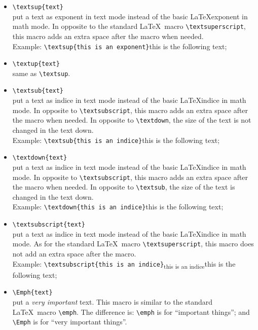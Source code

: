 \documentclass[book]{upmethodology-document}
\begin{document}
\begin{itemize}
\item \texttt{{\textbackslash}textsup\{text\}} \\
	put a text as exponent in text mode instead of the basic \LaTeX exponent in math mode. In opposite to the standard \LaTeX\ macro \texttt{{\textbackslash}textsuperscript}, this macro adds an extra space after the macro when needed. \\
	Example: \texttt{{\textbackslash}textsup\{this is an exponent\}}this is the following text;
\item \texttt{{\textbackslash}textup\{text\}} \\
	same as \texttt{{\textbackslash}textsup}.
\item \texttt{{\textbackslash}textsub\{text\}} \\
	put a text as indice in text mode instead of the basic \LaTeX indice in math mode. In opposite to \texttt{{\textbackslash}textsubscript}, this macro adds an extra space after the macro when needed. In opposite to \texttt{{\textbackslash}textdown}, the size of the text is not changed in the text down. \\
	Example: \texttt{{\textbackslash}textsub\{this is an indice\}}this is the following text;
\item \texttt{{\textbackslash}textdown\{text\}} \\
	put a text as indice in text mode instead of the basic \LaTeX indice in math mode. In opposite to \texttt{{\textbackslash}textsubscript}, this macro adds an extra space after the macro when needed. In opposite to \texttt{{\textbackslash}textsub}, the size of the text is changed in the text down. \\
	Example: \texttt{{\textbackslash}textdown\{this is an indice\}}this is the following text;
\item \texttt{{\textbackslash}textsubscript\{text\}} \\
	put a text as indice in text mode instead of the basic \LaTeX indice in math mode. As for the standard \LaTeX\ macro \texttt{{\textbackslash}textsuperscript}, this macro does not add an extra space after the macro. \\
	Example: \texttt{{\textbackslash}textsubscript\{this is an indice\}}\textsubscript{this is an indice}this is the following text;
\item \texttt{{\textbackslash}Emph\{text\}} \\
	put a \emph{very important} text. This macro is similar to the standard \LaTeX\ macro \texttt{{\textbackslash}emph}. The difference is: \texttt{{\textbackslash}emph} is for ``important things''; and \texttt{{\textbackslash}Emph} is for ``very important things''.\\

\end{itemize}
\end{document}
